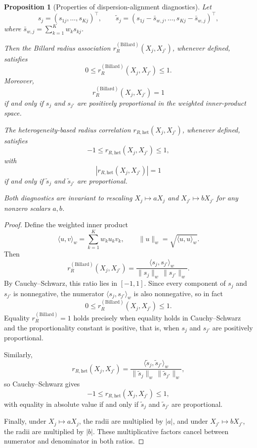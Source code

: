 \documentclass[preprint, times, 12pt, authoryear]{elsarticle}
\newtheorem{proposition}[theorem]{Proposition}
\begin{document}
 \begin{proposition}[Properties of dispersion-alignment diagnostics]\label{prop:level5_bounds}
 	Let
 	\[
 	s_j=(s_{1j},\ldots,s_{Kj})^\top,
 	\qquad
 	\tilde s_j=(s_{1j}-\bar s_{w,j},\ldots,s_{Kj}-\bar s_{w,j})^\top,
 	\]
 	where $\bar s_{w,j}=\sum_{k=1}^K w_k s_{kj}$.
 	
 	Then the Billard radius association $r_R^{(\mathrm{Billard})}(X_j,X_{j'})$, whenever defined, satisfies
 	\[
 	0\le r_R^{(\mathrm{Billard})}(X_j,X_{j'})\le 1.
 	\]
 	Moreover,
 	\[
 	r_R^{(\mathrm{Billard})}(X_j,X_{j'})=1
 	\]
 	if and only if $s_j$ and $s_{j'}$ are positively proportional in the weighted inner-product space.
 	
 	The heterogeneity-based radius correlation $r_{R,\mathrm{het}}(X_j,X_{j'})$, whenever defined, satisfies
 	\[
 	-1\le r_{R,\mathrm{het}}(X_j,X_{j'})\le 1,
 	\]
 	with
 	\[
 	|r_{R,\mathrm{het}}(X_j,X_{j'})|=1
 	\]
 	if and only if $\tilde s_j$ and $\tilde s_{j'}$ are proportional.
 	
 	Both diagnostics are invariant to rescaling $X_j\mapsto aX_j$ and $X_{j'}\mapsto bX_{j'}$ for any nonzero scalars $a,b$.
 \end{proposition}
 
 \begin{proof}
 	Define the weighted inner product
 	\[
 	\langle u,v\rangle_w=\sum_{k=1}^K w_k u_k v_k,
 	\qquad
 	\|u\|_w=\sqrt{\langle u,u\rangle_w}.
 	\]
 	Then
 	\[
 	r_R^{(\mathrm{Billard})}(X_j,X_{j'})
 	=
 	\frac{\langle s_j,s_{j'}\rangle_w}{\|s_j\|_w\,\|s_{j'}\|_w}.
 	\]
 	By Cauchy--Schwarz, this ratio lies in $[-1,1]$. Since every component of $s_j$ and $s_{j'}$ is nonnegative, the numerator $\langle s_j,s_{j'}\rangle_w$ is also nonnegative, so in fact
 	\[
 	0\le r_R^{(\mathrm{Billard})}(X_j,X_{j'})\le 1.
 	\]
 	Equality $r_R^{(\mathrm{Billard})}=1$ holds precisely when equality holds in Cauchy--Schwarz and the proportionality constant is positive, that is, when $s_j$ and $s_{j'}$ are positively proportional.
 	
 	Similarly,
 	\[
 	r_{R,\mathrm{het}}(X_j,X_{j'})
 	=
 	\frac{\langle \tilde s_j,\tilde s_{j'}\rangle_w}{\|\tilde s_j\|_w\,\|\tilde s_{j'}\|_w},
 	\]
 	so Cauchy--Schwarz gives
 	\[
 	-1\le r_{R,\mathrm{het}}(X_j,X_{j'})\le 1,
 	\]
 	with equality in absolute value if and only if $\tilde s_j$ and $\tilde s_{j'}$ are proportional.
 	
 	Finally, under $X_j\mapsto aX_j$, the radii are multiplied by $|a|$, and under $X_{j'}\mapsto bX_{j'}$, the radii are multiplied by $|b|$. These multiplicative factors cancel between numerator and denominator in both ratios.
 \end{proof}
 
\end{document}
